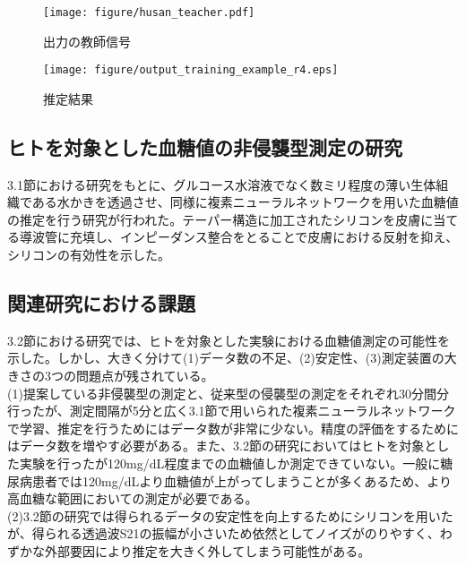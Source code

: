 \documentclass[11pt,a4paper,uplatex,draft]{ujarticle}
\begin{document}
\begin{figure}[htbp]
    \begin{minipage}{0.5\hsize}
        \begin{center}
            \texttt{[image: figure/husan\_teacher.pdf]}
        \end{center}
        \caption{出力の教師信号}
        \label{fig:husan_teacher}
    \end{minipage}
    \begin{minipage}{0.5\hsize}
        \begin{center}
            \texttt{[image: figure/output\_training\_example\_r4.eps]}
        \end{center}
        \caption{推定結果}
        \label{fig:husan_result}
    \end{minipage}
\end{figure}

\subsection{ヒトを対象とした血糖値の非侵襲型測定の研究}
3.1節における研究をもとに、グルコース水溶液でなく数ミリ程度の薄い生体組織である水かきを透過させ、同様に複素ニューラルネットワークを用いた血糖値の推定を行う研究が行われた\cite{Nagaesan}。テーパー構造に加工されたシリコンを皮膚に当てる導波管に充填し、インピーダンス整合をとることで皮膚における反射を抑え、シリコンの有効性を示した。

\newpage
\subsection{関連研究における課題}
3.2節における研究では、ヒトを対象とした実験における血糖値測定の可能性を示した。しかし、大きく分けて(1)データ数の不足、(2)安定性、(3)測定装置の大きさの3つの問題点が残されている。\\

(1)提案している非侵襲型の測定と、従来型の侵襲型の測定をそれぞれ30分間分行ったが、測定間隔が5分と広く3.1節で用いられた複素ニューラルネットワークで学習、推定を行うためにはデータ数が非常に少ない。精度の評価をするためにはデータ数を増やす必要がある。また、3.2節の研究においてはヒトを対象とした実験を行ったが120mg/dL程度までの血糖値しか測定できていない。一般に糖尿病患者では120mg/dLより血糖値が上がってしまうことが多くあるため、より高血糖な範囲においての測定が必要である。\\

(2)3.2節の研究では得られるデータの安定性を向上するためにシリコンを用いたが、得られる透過波S21の振幅が小さいため依然としてノイズがのりやすく、わずかな外部要因により推定を大きく外してしまう可能性がある。\\
\end{document}

